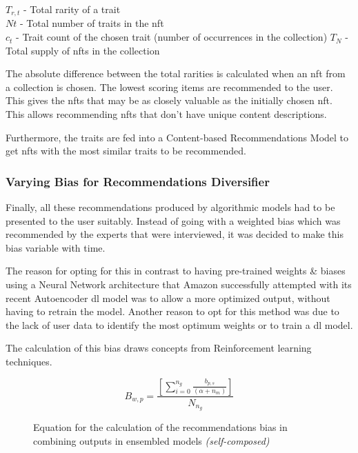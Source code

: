 \noindent$T_{r,t}$ - Total rarity of a trait\\
$Nt$ - Total number of traits in the \gls{nft}\\
$c_{t}$ - Trait count of the chosen trait (number of occurrences in the collection)
$T_{N}$ - Total supply of \gls{nft}s in the collection

The absolute difference between the total rarities is calculated when an \gls{nft} from a collection is chosen. The lowest scoring items are recommended to the user. This gives the \gls{nft}s that may be as closely valuable as the initially chosen \gls{nft}. This allows recommending \gls{nft}s that don't have unique content descriptions.

Furthermore, the traits are fed into a Content-based Recommendations Model to get \gls{nft}s with the most similar traits to be recommended.





\subsubsection{Varying Bias for Recommendations Diversifier}
Finally, all these recommendations produced by algorithmic models had to be presented to the user suitably. Instead of going with a weighted bias which was recommended by the experts that were interviewed, it was decided to make this bias variable with time. 

The reason for opting for this in contrast to having pre-trained weights \& biases using a Neural Network architecture that Amazon successfully attempted with its recent Autoencoder \autocite{larry_history_2019} \gls{dl} model was to allow a more optimized output, without having to retrain the model. Another reason to opt for this method was due to the lack of user data to identify the most optimum weights or to train a \gls{dl} model.

The calculation of this bias draws concepts from Reinforcement learning techniques.
\begin{figure}[h!]
\begin{equation}
B_{w,p} = \frac{\left[ \sum^{n_{g}}_{i=0} \frac{b_{p,s}}{\left( \alpha + n_{m} \right)} \right]}{N_{n_{g}}} 
\end{equation}
\caption*{Equation for the calculation of the recommendations bias in combining outputs in ensembled models \textit{(self-composed)}}
\end{figure}

